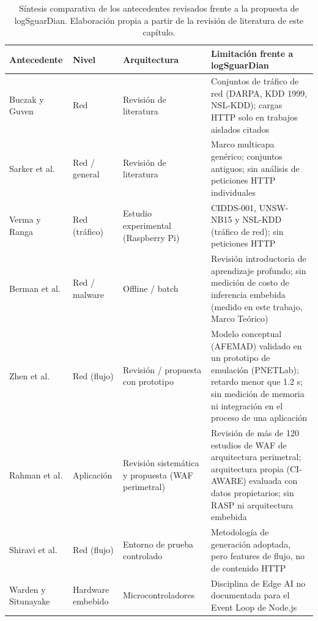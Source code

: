 \begin{table}[h]
\small
\begin{tabular}{|p{2.7cm}|p{2.1cm}|p{2.9cm}|p{5.3cm}|}
\hline
\textbf{Antecedente} & \textbf{Nivel} & \textbf{Arquitectura} & \textbf{Limitación frente a logSguarDian} \\ \hline
Buczak y Guven \cite{buczak2016} & Red & Revisión de literatura & Conjuntos de tráfico de red (DARPA, KDD 1999, NSL-KDD); cargas HTTP solo en trabajos aislados citados \\ \hline
Sarker et al. \cite{sarker2020} & Red / general & Revisión de literatura & Marco multicapa genérico; conjuntos antiguos; sin análisis de peticiones HTTP individuales \\ \hline
Verma y Ranga \cite{verma2020} & Red (tráfico) & Estudio experimental (Raspberry Pi) & CIDDS-001, UNSW-NB15 y NSL-KDD (tráfico de red); sin peticiones HTTP \\ \hline
Berman et al. \cite{berman2019} & Red / malware & Offline / batch & Revisión introductoria de aprendizaje profundo; sin medición de costo de inferencia embebida (medido en este trabajo, Marco Teórico) \\ \hline
Zhen et al. \cite{zhen2025} & Red (flujo) & Revisión / propuesta con prototipo & Modelo conceptual (AFEMAD) validado en un prototipo de emulación (PNETLab); retardo menor que 1.2 s; sin medición de memoria ni integración en el proceso de una aplicación \\ \hline
Rahman et al. \cite{rahman2026} & Aplicación & Revisión sistemática y propuesta (WAF perimetral) & Revisión de más de 120 estudios de WAF de arquitectura perimetral; arquitectura propia (CI-AWARE) evaluada con datos propietarios; sin RASP ni arquitectura embebida \\ \hline
Shiravi et al. \cite{shiravi2012} & Red (flujo) & Entorno de prueba controlado & Metodología de generación adoptada, pero features de flujo, no de contenido HTTP \\ \hline
Warden y Situnayake \cite{warden2019} & Hardware embebido & Microcontroladores & Disciplina de Edge AI no documentada para el Event Loop de Node.js \\ \hline
\end{tabular}
\caption[Síntesis comparativa de antecedentes]{Síntesis comparativa de los antecedentes revisados frente a la propuesta de logSguarDian. Elaboración propia a partir de la revisión de literatura de este capítulo.}
\label{cuadro:sintesis_antecedentes}
\end{table}

